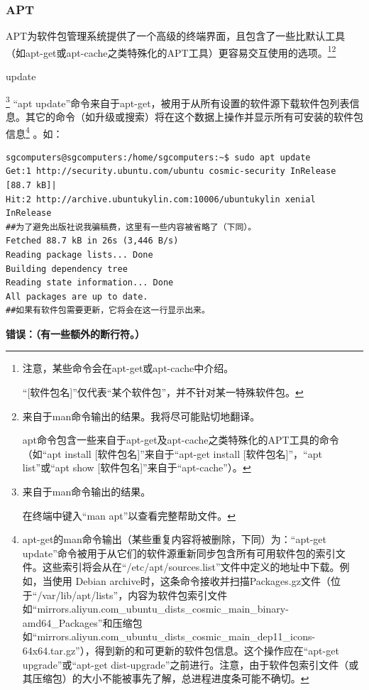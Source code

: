 \documentclass{book}
\begin{document}
\subsubsection{APT}
\cite{manAPT}\par
APT为软件包管理系统提供了一个高级的终端界面，且包含了一些比默认工具（如apt-get或apt-cache之类特殊化的APT工具）更容易交互使用的选项。\footnote{注意，某些命令会在apt-get或apt-cache中介绍。 \par “[软件包名]”仅代表“某个软件包”，并不针对某一特殊软件包。}\footnote{来自于man命令输出的结果。我将尽可能贴切地翻译。 \par apt命令包含一些来自于apt-get及apt-cache之类特殊化的APT工具的命令（如“apt install [软件包名]”来自于“apt-get install [软件包名]”，“apt list”或“apt show [软件包名]”来自于“apt-cache”）。}\par
\begin{center} update \end{center}
\footnote{来自于man命令输出的结果。 \par 在终端中键入“man apt”以查看完整帮助文件。} “apt update”命令来自于apt-get，被用于从所有设置的软件源下载软件包列表信息。其它的命令（如升级或搜索）将在这个数据上操作并显示所有可安装的软件包信息\footnote{apt-get的man命令输出（某些重复内容将被删除，下同）为：“apt-get update”命令被用于从它们的软件源重新同步包含所有可用软件包的索引文件。这些索引将会从在“/etc/apt/sources.list”文件中定义的地址中下载。例如，当使用 Debian archive时，这条命令接收并扫描Packages.gz文件（位于“/var/lib/apt/lists”，内容为软件包索引文件如“mirrors.aliyun.com\_ubuntu\_dists\_cosmic\_main\_binary-amd64\_Packages”和压缩包如“mirrors.aliyun.com\_ubuntu\_dists\_cosmic\_main\_dep11\_icons-64x64.tar.gz”），得到新的和可更新的软件包信息。这个操作应在“apt-get upgrade”或“apt-get dist-upgrade”之前进行。注意，由于软件包索引文件（或其压缩包）的大小不能被事先了解，总进程进度条可能不确切。} 。如：
\begin{verbatim}
sgcomputers@sgcomputers:/home/sgcomputers:~$ sudo apt update
Get:1 http://security.ubuntu.com/ubuntu cosmic-security InRelease [88.7 kB]|
Hit:2 http://archive.ubuntukylin.com:10006/ubuntukylin xenial InRelease
##为了避免出版社说我骗稿费，这里有一些内容被省略了（下同）。
Fetched 88.7 kB in 26s (3,446 B/s)
Reading package lists... Done
Building dependency tree
Reading state information... Done
All packages are up to date.
##如果有软件包需要更新，它将会在这一行显示出来。
\end{verbatim}
\large \textbf{错误：（有一些额外的断行符。）}\normalsize  \par
\end{document}
